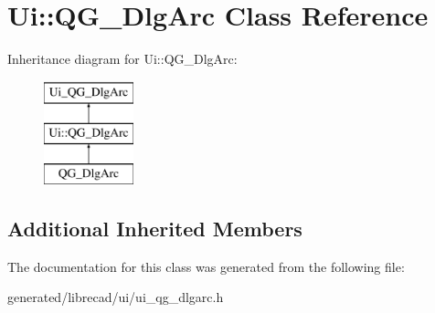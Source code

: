 \hypertarget{classUi_1_1QG__DlgArc}{\section{Ui\-:\-:Q\-G\-\_\-\-Dlg\-Arc Class Reference}
\label{classUi_1_1QG__DlgArc}
}
Inheritance diagram for Ui\-:\-:Q\-G\-\_\-\-Dlg\-Arc\-:\begin{figure}[H]
\begin{center}
\leavevmode
\includegraphics[height=3.000000cm]{classUi_1_1QG__DlgArc}
\end{center}
\end{figure}
\subsection*{Additional Inherited Members}


The documentation for this class was generated from the following file\-:\begin{DoxyCompactItemize}
\item 
generated/librecad/ui/ui\-\_\-qg\-\_\-dlgarc.\-h\end{DoxyCompactItemize}
